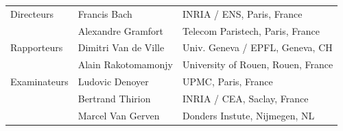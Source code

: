 \documentclass[nobib, a4paper, notoc, twoside, justified]{tufte-book}
\begin{document}
\begin{titlepage}
\begin{fullwidth}
\begin{center}
{\LARGE
\begin{tabular}{lll}
\vspace{1pc}
{Directeurs} & Francis Bach &  INRIA / ENS, Paris, France \\
\vspace{1pc}
& Alexandre Gramfort & Telecom Paristech, Paris, France\\
\vspace{1pc}
{ Rapporteurs} & Dimitri Van de Ville  & Univ. Geneva / EPFL,  Geneva, CH \\
\vspace{1pc}
 &Alain Rakotomamonjy  & University of Rouen, Rouen, France \\
\vspace{1pc}
{ Examinateurs} & Ludovic Denoyer & UPMC, Paris, France \\
\vspace{1pc}
& Bertrand Thirion & INRIA / CEA, Saclay, France \\
\vspace{1pc}
 & Marcel Van Gerven & Donders Instute, Nijmegen, NL \\
\end{tabular}
}


\end{center}
\end{fullwidth}
\end{titlepage}


\end{document}
